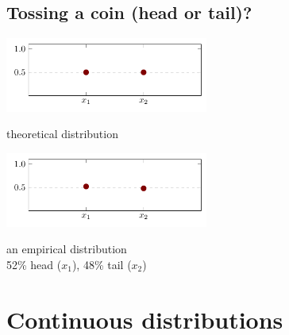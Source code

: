 \documentclass[a4paper]{article}
\begin{document}
	\subsection{Tossing a coin (head or tail)?}
		\begin{multicols}{2}
		\centering
		\includegraphics[width=0.5\textwidth]{tail_head_theoretical}
				
		theoretical distribution


		\includegraphics[width=0.5\textwidth]{tail_head_empirical}
		
		an empirical distribution\\52\% head ($x_1$), 48\% tail ($x_2$) 
		\end{multicols}
	
	
	\section{Continuous distributions}
\end{document}
